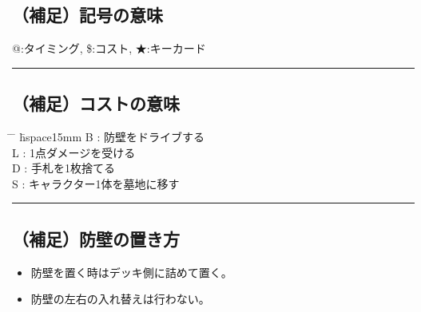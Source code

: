 \documentclass[twocolumn,a5paper,papersize,10pt]{jarticle}
\begin{document}
\subsection*{（補足）記号の意味}
\vspace{-1zh}%
{\small @:タイミング, 
\$:コスト, 
★:キーカード}

\vspace{1mm}%
\hrule height 0.1mm depth 0mm width 66.5mm %
\vspace{-3zh}%

\subsection*{（補足）コストの意味}
\vspace{-1zh}%
\begin{small}
\begin{tabbing}
 \hspace{2mm} \= \hspace{2mm} \= \hspace{1mm} \= hspace{15mm} \kill
\> B \> : \>防壁をドライブする \\
\> L \> : \>1点ダメージを受ける \\
\> D \> : \>手札を1枚捨てる \\
\> S \> : \>キャラクター1体を墓地に移す \\
\end{tabbing}
\end{small}

\vspace{-3zh}%
\hrule height 0.1mm depth 0mm width 66.5mm %
\vspace{-3zh}%

\subsection*{（補足）防壁の置き方}
\vspace{-1zh}%
\begin{itemize}
\setlength{\leftskip}{-0.3cm}%
\setlength{\parskip}{0pt}      %

\item 防壁を置く時はデッキ側に詰めて置く。
\item 防壁の左右の入れ替えは行わない。
\end{itemize}
\end{document}
